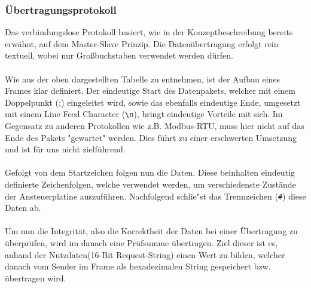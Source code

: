 \subsubsection{Übertragungsprotokoll} \label{sssec:uebertragungsprotokoll}
\begin{table}[H]
    \centering
{}
    \caption{Visualisierung des Datenakets}
\end{table}
Das verbindungslose Protokoll basiert, wie in der Konzeptbeschreibung bereits erwähnt, auf dem Master-Slave Prinzip.
Die Datenübertragung erfolgt rein textuell, wobei nur Großbuchstaben verwendet werden dürfen.\\\\
Wie aus der oben dargestellten Tabelle zu entnehmen, ist der Aufbau eines Frames klar definiert.
Der eindeutige Start des Datenpakets, welcher mit einem Doppelpunkt (:) eingeleitet wird, sowie das ebenfalls eindeutige Ende, umgesetzt mit einem Line Feed Character (\verb!\n!), bringt eindeutige Vorteile mit sich.
Im Gegensatz zu anderen Protokollen wie z.B. Modbus-RTU, muss hier nicht auf das Ende des Pakets "gewartet" werden.
Dies führt zu einer erschwerten Umsetzung und ist für uns nicht zielführend.\\\\
Gefolgt von dem Startzeichen folgen nun die Daten.
Diese beinhalten eindeutig definierte Zeichenfolgen, welche verwendet werden, um verschiedenste Zustände der Ansteuerplatine auszuführen.
Nachfolgend schlie"st das Trennzeichen (\verb!#!) diese Daten ab.\\\\
Um nun die Integrität, also die Korrektheit der Daten bei einer Übertragung zu überprüfen, wird im danach eine Prüfsumme übertragen.
Ziel dieser ist es, anhand der Nutzdaten(16-Bit Request-String) einen Wert zu bilden, welcher danach vom Sender im Frame als hexadezimalen String gespeichert bzw. übertragen wird.
